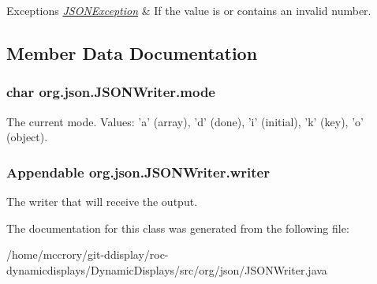 \begin{DoxyExceptions}{Exceptions}
{\em \hyperlink{classorg_1_1json_1_1JSONException}{J\-S\-O\-N\-Exception}} & If the value is or contains an invalid number. \\
\hline
\end{DoxyExceptions}


\subsection{Member Data Documentation}
\hypertarget{classorg_1_1json_1_1JSONWriter_acabe6b245b148eabfaa3cf975f98073f}{
\subsubsection[{mode}]{\setlength{\rightskip}{0pt plus 5cm}char org.\-json.\-J\-S\-O\-N\-Writer.\-mode\hspace{0.3cm}{\ttfamily [protected]}}}\label{classorg_1_1json_1_1JSONWriter_acabe6b245b148eabfaa3cf975f98073f}
The current mode. Values\-: 'a' (array), 'd' (done), 'i' (initial), 'k' (key), 'o' (object). \hypertarget{classorg_1_1json_1_1JSONWriter_aa90b49b9c27c56b9d9c72186517b83c6}{
\subsubsection[{writer}]{\setlength{\rightskip}{0pt plus 5cm}Appendable org.\-json.\-J\-S\-O\-N\-Writer.\-writer\hspace{0.3cm}{\ttfamily [protected]}}}\label{classorg_1_1json_1_1JSONWriter_aa90b49b9c27c56b9d9c72186517b83c6}
The writer that will receive the output. 

The documentation for this class was generated from the following file\-:\begin{DoxyCompactItemize}
\item 
/home/mccrory/git-\/ddisplay/roc-\/dynamicdisplays/\-Dynamic\-Displays/src/org/json/J\-S\-O\-N\-Writer.\-java\end{DoxyCompactItemize}
